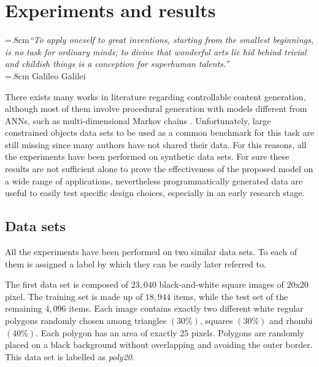 \chapter{Experiments and results}
\label{ch:experiments_and_results}

\begin{flushright}
\rightskip=.8cm\textit{``To apply oneself to great inventions, starting from the smallest beginnings, is no task for ordinary minds; to divine that wonderful arts lie hid behind trivial and childish things is a conception for superhuman talents.''} \\
\vspace{.2em}
\rightskip=.8cm Galileo Galilei
\end{flushright}
\vspace{1em}


There exists many works in literature regarding controllable content generation, although most of them involve procedural generation with models different from ANNs, such as multi-dimensional Markov chains \cite{markov}. Unfortunately, large constrained objects data sets to be used as a common benchmark for this task are still missing since many authors have not shared their data. For this reasons, all the experiments have been performed on synthetic data sets. For sure these results are not sufficient alone to prove the effectiveness of the proposed model on a wide range of applications, nevertheless programmatically generated data are useful to easily test specific design choices, especially in an early research stage.


\section{Data sets}

All the experiments have been performed on two similar data sets. To each of them is assigned a label by which they can be easily later referred to.

The first data set is composed of $23,040$ black-and-white square images of $20$x$20$ pixel. The training set is made up of $18,944$ items, while the test set of the remaining $4,096$ items. Each image contains exactly two different white regular polygons randomly chosen among triangles $(30\%)$, squares $(30\%)$ and rhombi $(40\%)$. Each polygon has an area of exactly 25 pixels. Polygons are randomly placed on a black background without overlapping and avoiding the outer border. This data set is labelled as \textit{poly20}.

